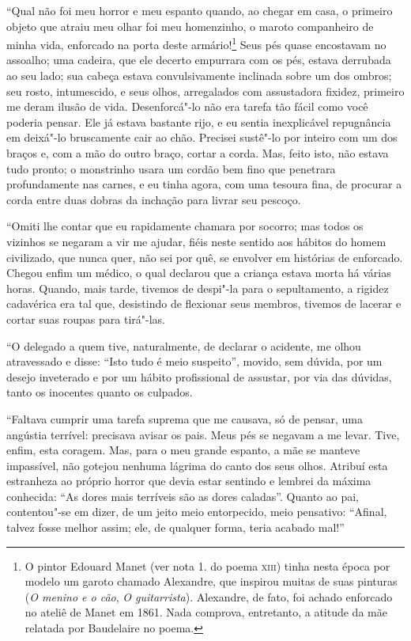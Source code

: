 “Qual não foi meu horror e meu espanto quando, ao chegar em
casa, o primeiro objeto que atraiu meu olhar foi meu homenzinho, o
maroto companheiro de minha vida, enforcado na porta deste
armário!\footnote{  O pintor Edouard Manet (ver nota 1. do poema 
\textsc{xiii}) tinha nesta época
por modelo um garoto chamado Alexandre, que inspirou muitas de suas
pinturas (\textit{O menino e o cão}, \textit{O guitarrista}). Alexandre, de fato,
foi achado enforcado no ateliê de Manet em 1861. Nada comprova,
entretanto, a atitude da mãe relatada por Baudelaire no poema.} 
Seus pés quase encostavam no assoalho; uma
cadeira, que ele decerto empurrara com os pés, estava derrubada ao
seu lado; sua cabeça estava convulsivamente inclinada sobre um dos 
ombros; seu rosto, intumescido, e seus olhos, arregalados com 
assustadora fixidez, primeiro me deram ilusão de vida.
Desenforcá"-lo não
era tarefa tão fácil como você poderia
pensar. Ele já estava bastante rijo, e eu sentia inexplicável repugnância
em deixá"-lo bruscamente cair ao chão. Precisei
sustê"-lo por inteiro com um dos braços e, com a mão do outro braço,
cortar a corda. Mas, feito isto, não estava tudo pronto; o monstrinho
usara um cordão bem fino que penetrara profundamente nas
carnes, e eu tinha agora, com uma tesoura fina, de procurar a corda 
entre duas dobras da inchação para livrar seu pescoço.

“Omiti lhe contar que eu rapidamente chamara por
socorro; mas todos os vizinhos se negaram a vir me ajudar,
fiéis neste sentido aos hábitos do homem civilizado, que nunca quer,
não sei por quê, se envolver em histórias de enforcado. Chegou enfim um
médico, o qual declarou que a criança estava morta há várias horas.
Quando, mais tarde, tivemos de despi"-la para o sepultamento, a
rigidez cadavérica era tal que, desistindo de flexionar seus membros,
tivemos de lacerar e cortar suas roupas para tirá"-las.

“O delegado a quem tive, naturalmente, de declarar o
acidente, me olhou atravessado e disse: ``Isto tudo é meio
suspeito'', movido, sem dúvida, por um desejo inveterado e
por um hábito profissional de assustar, por via das dúvidas, tanto os
inocentes quanto os culpados.

“Faltava cumprir uma tarefa suprema que me causava, só
de pensar, uma angústia terrível: precisava avisar os pais. Meus pés
se negavam a me levar. Tive, enfim, esta coragem.
Mas, para o meu grande
espanto, a mãe se manteve impassível, não gotejou nenhuma lágrima do canto
dos seus olhos. Atribuí esta estranheza ao próprio horror que devia estar
sentindo e lembrei da máxima conhecida: ``As dores mais
terríveis são as dores caladas''. Quanto ao pai,
contentou"-se em dizer, de um jeito meio entorpecido, meio pensativo:
“Afinal, talvez fosse melhor assim; ele, de qualquer
forma, teria acabado mal!''

